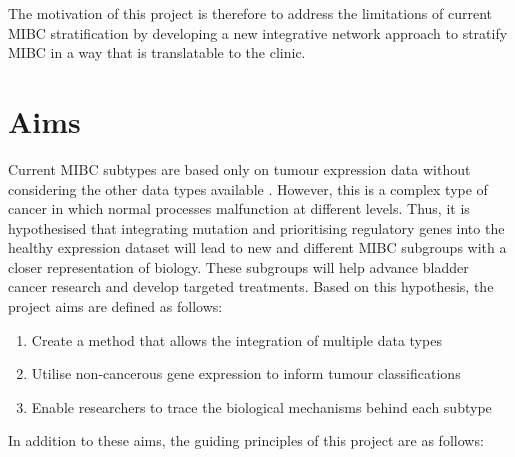 The motivation of this project is therefore to address the limitations of current \gls{MIBC} stratification by developing a new integrative network approach to stratify \gls{MIBC} in a way that is translatable to the clinic.




\section{Aims} \label{s:intro:aims}



Current MIBC subtypes are based only on tumour expression data without considering the other data types available \citep{Kamoun2020-tj, Robertson2017-mg}. However, this is a complex type of cancer in which normal processes malfunction at different levels. Thus, it is hypothesised that integrating mutation and prioritising regulatory genes into the healthy expression dataset will lead to new and different MIBC subgroups with a closer representation of biology. These subgroups will help advance bladder cancer research and develop targeted treatments. Based on this hypothesis, the project aims are defined as follows:

\begin{enumerate}
    \item Create a method that allows the integration of multiple data types
    \item Utilise non-cancerous gene expression to inform tumour classifications
    \item Enable researchers to trace the biological mechanisms behind each subtype
\end{enumerate}

In addition to these aims, the guiding principles of this project are as follows:

